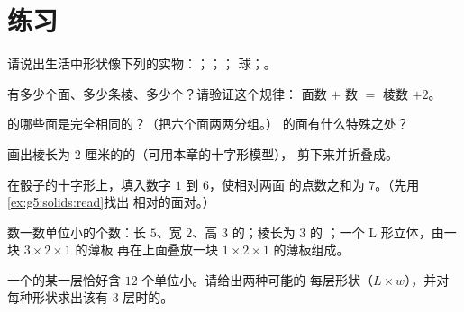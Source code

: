 \section{练习}

\begin{exercise}[$\star$]\label{exo:g5:solids:1}
请说出生活中形状像下列的实物：；；；
球；。
\end{exercise}

\begin{exercise}[$\star$]\label{exo:g5:solids:2}
有多少个面、多少条棱、多少个？请验证这个规律：
面数 $+$ 数 $=$ 棱数 $+ 2$。
\end{exercise}

\begin{exercise}[$\star$]\label{exo:g5:solids:3}
的哪些面是完全相同的？（把六个面两两分组。）
的面有什么特殊之处？
\end{exercise}

\begin{exercise}[$\star$]\label{exo:g5:solids:4}
画出棱长为 $2$ 厘米的的（可用本章的十字形模型），
剪下来并折叠成。
\end{exercise}

\begin{exercise}[$\star$]\label{exo:g5:solids:5}
在骰子的十字形上，填入数字 $1$ 到 $6$，使相对两面
的点数之和为 $7$。（先用\cref{ex:g5:solids:read}找出
相对的面对。）
\end{exercise}

\begin{exercise}[$\star$]\label{exo:g5:solids:6}
数一数单位小的个数：长 $5$、宽 $2$、高 $3$ 的；棱长为 $3$ 的
；一个 L 形立体，由一块 $3 \times 2 \times 1$ 的薄板
再在上面叠放一块 $1 \times 2 \times 1$ 的薄板组成。
\end{exercise}

\begin{exercise}[$\star$]\label{exo:g5:solids:7}
一个的某一层恰好含 $12$ 个单位小。请给出两种可能的
每层形状（$L \times w$），并对每种形状求出该有
$3$ 层时的。
\end{exercise}

